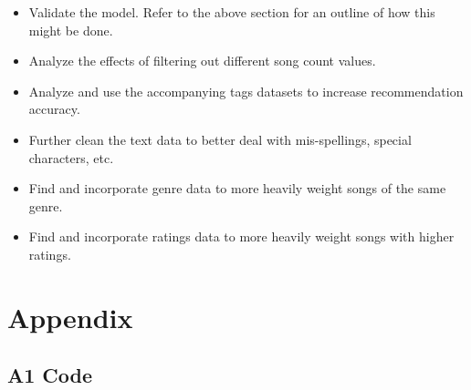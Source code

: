 \documentclass[11pt]{article}
\providecommand{\tightlist}{%
      \setlength{\itemsep}{0pt}\setlength{\parskip}{0pt}}
\begin{document}
\begin{itemize}
\tightlist
\item
  Validate the model. Refer to the above section for an outline of how
  this might be done.
\item
  Analyze the effects of filtering out different song count values.
\item
  Analyze and use the accompanying tags datasets to increase
  recommendation accuracy.
\item
  Further clean the text data to better deal with mis-spellings, special
  characters, etc.
\item
  Find and incorporate genre data to more heavily weight songs of the
  same genre.
\item
  Find and incorporate ratings data to more heavily weight songs with
  higher ratings.
\end{itemize}

    \section{Appendix}\label{appendix}

    \subsection{A1 Code}\label{a1-code}
\end{document}
